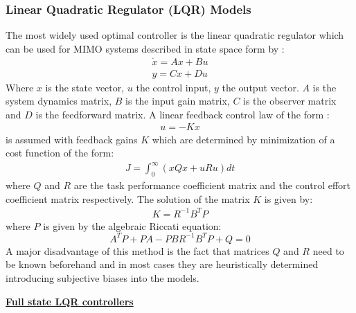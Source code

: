 \subsubsection{Linear Quadratic Regulator (LQR) Models}
The most widely used optimal controller is the linear quadratic regulator which can be used for MIMO systems described in state space form by :
\begin{align*}
    \dot{x}=Ax+Bu \\
    y=Cx+Du
\end{align*}
Where \ensuremath{x} is the state vector, \ensuremath{u} the control input, \ensuremath{y} the output vector. \ensuremath{A} is the system dynamics matrix, \ensuremath{B} is the input gain matrix, \ensuremath{C} is the observer matrix and \ensuremath{D} is the feedforward matrix.  A linear feedback control law of the form :
\begin{align*}
    u=-Kx
\end{align*}
is assumed with feedback gains \ensuremath{K} which are  determined by minimization of a cost function of the form:
\begin{align*}
    J=\int_{0}^{\infty} (xQx+uRu)dt
\end{align*}
where \ensuremath{Q} and \ensuremath{R} are the task performance coefficient matrix and the control effort coefficient matrix respectively. The solution of the matrix \ensuremath{K} is given by:
\begin{align*}
    K = R^{-1} B^T P
\end{align*}
where \ensuremath{P} is given by the algebraic Riccati equation:
\begin{equation*}
    A^{T} P+P A-P B R^{-1}B^{T} P+Q=0
\end{equation*}
A major disadvantage of this method is the fact that matrices \ensuremath{Q} and \ensuremath{R} need to be known beforehand and in most cases they are heuristically determined introducing subjective biases into the models.

\bigbreak
\underline{\textbf{Full state LQR controllers }}
\newline


